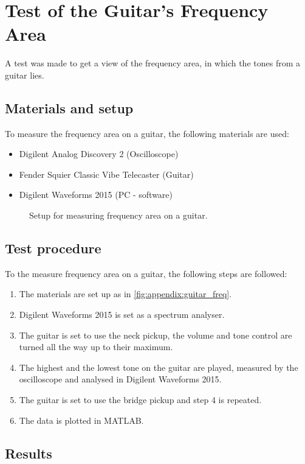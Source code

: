 \chapter{Test of the Guitar's Frequency Area}\label{app:frequency_area}
A test was made to get a view of the frequency area, in which the tones from a guitar lies.

\section*{Materials and setup}
To measure the frequency area on a guitar, the following materials are used:
\begin{itemize}
\item Digilent Analog Discovery 2 (Oscilloscope)
\item Fender Squier Classic Vibe Telecaster (Guitar)
\item Digilent Waveforms 2015 (PC - software)
\end{itemize}

\begin{figure}[htbp!]
\centering
\def\svgwidth{\columnwidth}

\caption{Setup for measuring frequency area on a guitar.}
		\label{fig:appendix:guitar_freq}
\end{figure}

\section*{Test procedure}
To the measure frequency area on a guitar, the following steps are followed:
\begin{enumerate}
\item The materials are set up as in \autoref{fig:appendix:guitar_freq}.
\item Digilent Waveforms 2015 is set as a spectrum analyser. 
\item The guitar is set to use the neck pickup, the volume and tone control are turned all the way up to their maximum.
\item The highest and the lowest tone on the guitar are played, measured by the oscilloscope and analysed in Digilent Waveforms 2015.
\item The guitar is set to use the bridge pickup and step 4 is repeated. 
\item The data is plotted in MATLAB.
\end{enumerate}

\section*{Results}

